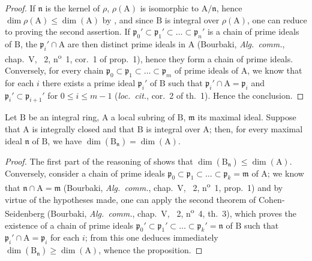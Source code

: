 \begin{proof}
If $\mathfrak{n}$ is the kernel of $\rho$, $\rho(\mathrm{A})$ is isomorphic to $\mathrm{A}/\mathfrak{n}$, hence $\dim\rho(\mathrm{A})\leq\dim(\mathrm{A})$ by , and since $\mathrm{B}$ is integral over $\rho(\mathrm{A})$, one can reduce to proving the second assertion.
If $\mathfrak{p}_0'\subset\mathfrak{p}_1'\subset\ldots\subset\mathfrak{p}_n'$ is a chain of prime ideals of $\mathrm{B}$, the $\mathfrak{p}_i'\cap\mathrm{A}$ are then distinct prime ideals in $\mathrm{A}$ (Bourbaki, \emph{Alg.~comm.}, chap.~V, \textsection~2, n\textsuperscript{o}~1, cor.~1 of prop.~1), hence they form a chain of prime ideals.
Conversely, for every chain $\mathfrak{p}_0\subset\mathfrak{p}_1\subset\ldots\subset\mathfrak{p}_m$ of prime ideals of $\mathrm{A}$, we know that for each $i$ there exists a prime ideal $\mathfrak{p}_i'$ of $\mathrm{B}$ such that $\mathfrak{p}_i'\cap\mathrm{A}=\mathfrak{p}_i$ and $\mathfrak{p}_i'\subset\mathfrak{p}_{i+1}'$ for $0\leq i\leq m-1$ (\emph{loc.~cit.}, cor.~2 of th.~1).
Hence the conclusion.
\end{proof}

\begin{proposition}[16.1.6]
\label{0.16.1.6}
Let $\mathrm{B}$ be an integral ring, $\mathrm{A}$ a local subring of $\mathrm{B}$, $\mathfrak{m}$ its maximal ideal.
Suppose that $\mathrm{A}$ is integrally closed and that $\mathrm{B}$ is integral over $\mathrm{A}$; then, for every maximal ideal $\mathfrak{n}$ of $\mathrm{B}$, we have $\dim(\mathrm{B}_\mathfrak{n})=\dim(\mathrm{A})$.
\end{proposition}

\begin{proof}
The first part of the reasoning of  shows that $\dim(\mathrm{B}_\mathfrak{n})\leq\dim(\mathrm{A})$.
Conversely, consider a chain of prime ideals $\mathfrak{p}_0\subset\mathfrak{p}_1\subset\ldots\subset\mathfrak{p}_k=\mathfrak{m}$ of $\mathrm{A}$; we know that $\mathfrak{n}\cap\mathrm{A}=\mathfrak{m}$ (Bourbaki, \emph{Alg.~comm.}, chap.~V, \textsection~2, n\textsuperscript{o}~1, prop.~1) and by virtue of the hypotheses made, one can apply the second theorem of Cohen-Seidenberg (Bourbaki, \emph{Alg.~comm.}, chap.~V, \textsection~2, n\textsuperscript{o}~4, th.~3), which proves the existence of a chain of prime ideals $\mathfrak{p}_0'\subset\mathfrak{p}_1'\subset\ldots\subset\mathfrak{p}_k'=\mathfrak{n}$ of $\mathrm{B}$ such that $\mathfrak{p}_i'\cap\mathrm{A}=\mathfrak{p}_i$ for each $i$; from this one deduces immediately $\dim(\mathrm{B}_\mathfrak{n})\geq\dim(\mathrm{A})$, whence the proposition.
\end{proof}

